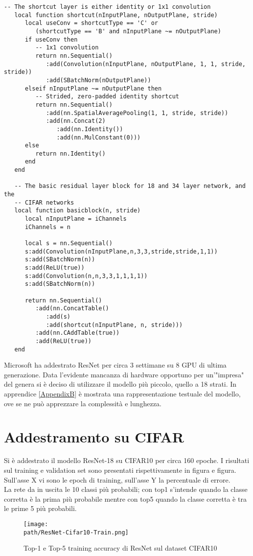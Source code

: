 \begin{lstlisting}[language={[5.2]Lua}]
-- The shortcut layer is either identity or 1x1 convolution
   local function shortcut(nInputPlane, nOutputPlane, stride)
      local useConv = shortcutType == 'C' or
         (shortcutType == 'B' and nInputPlane ~= nOutputPlane)
      if useConv then
         -- 1x1 convolution
         return nn.Sequential()
            :add(Convolution(nInputPlane, nOutputPlane, 1, 1, stride, stride))
            :add(SBatchNorm(nOutputPlane))
      elseif nInputPlane ~= nOutputPlane then
         -- Strided, zero-padded identity shortcut
         return nn.Sequential()
            :add(nn.SpatialAveragePooling(1, 1, stride, stride))
            :add(nn.Concat(2)
               :add(nn.Identity())
               :add(nn.MulConstant(0)))
      else
         return nn.Identity()
      end
   end

   -- The basic residual layer block for 18 and 34 layer network, and the
   -- CIFAR networks
   local function basicblock(n, stride)
      local nInputPlane = iChannels
      iChannels = n

      local s = nn.Sequential()
      s:add(Convolution(nInputPlane,n,3,3,stride,stride,1,1))
      s:add(SBatchNorm(n))
      s:add(ReLU(true))
      s:add(Convolution(n,n,3,3,1,1,1,1))
      s:add(SBatchNorm(n))

      return nn.Sequential()
         :add(nn.ConcatTable()
            :add(s)
            :add(shortcut(nInputPlane, n, stride)))
         :add(nn.CAddTable(true))
         :add(ReLU(true))
   end
\end{lstlisting}
 
Microsoft ha addestrato ResNet per circa 3 settimane su 8 GPU di ultima generazione. Data l'evidente mancanza di hardware opportuno per un'"impresa" del genera si è deciso di utilizzare il modello più piccolo, quello a 18 strati. In apprendice \ref{AppendixB} è mostrata una rappresentazione testuale del modello, ove se ne può apprezzare la complessità e lunghezza. 


\section{Addestramento su CIFAR}
Si è addestrato il modello ResNet-18 su CIFAR10 per circa 160 epoche. I risultati sul training e validation set sono presentati rispettivamente in figura e figura. Sull'asse X vi sono le epoch di training, sull'asse Y la percentuale di errore. 
\\
La rete da in uscita le 10 classi più probabili; con top1 s'intende quando la classe corretta è la prima più probabile mentre con top5 quando la classe corretta è tra le prime 5 più probabili. \\
\begin{figure}[h!]
 \centering
 \texttt{[image: \\path/ResNet-Cifar10-Train.png]} 
 \caption{Top-1 e Top-5 training accuracy di ResNet sul dataset CIFAR10}
 \label{fig:res-train}
\end{figure}

